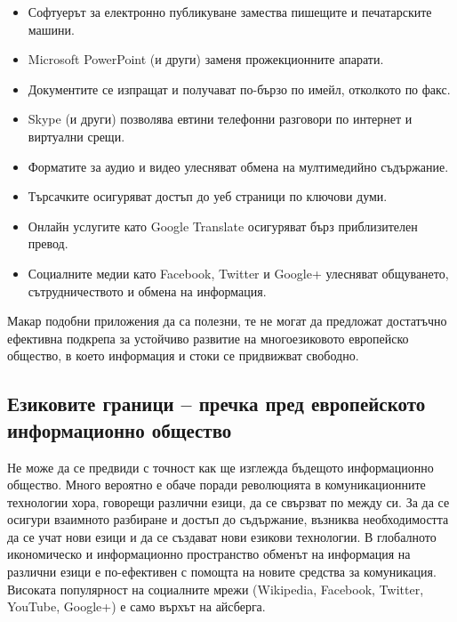 \begin{multicols}{2}
  \begin{itemize}
  \item Софтуерът за електронно публикуване замества пишещите и печатарските машини.
  \item Microsoft PowerPoint (и други) заменя прожекционните апарати.
  \item Документите се изпращат и получават по-бързо по имейл, отколкото по факс.
  \item Skype (и други) позволява евтини телефонни разговори по интернет и виртуални срещи.
  \item Форматите за аудио и видео улесняват обмена на мултимедийно съдържание.
  \item Търсачките осигуряват достъп до уеб страници по ключови думи.
  \item Онлайн услугите като Google Translate осигуряват бърз приблизителен превод.
  \item Социалните медии като Facebook,  Twitter  и  Google+  улесняват общуването, сътрудничеството и обмена на информация.
  \end{itemize}

  Макар подобни приложения да са полезни, те не могат да предложат достатъчно ефективна подкрепа за устойчиво развитие на многоезиковото европейско общество, в което информация и стоки се придвижват свободно.

  \subsection{Езиковите граници -- пречка пред европейското информационно общество}

  Не може да се предвиди с точност как ще изглежда
  бъдещото информационно общество. Много вероятно е обаче поради революцията в комуникационните технологии хора, говорещи различни езици, да се свързват по между си.
  За да се осигури взаимното разбиране и достъп до съдържание, възниква необходимостта да се учат нови езици и да се създават нови езикови технологии. В глобалното икономическо и информационно пространство обменът на информация на различни езици е по-ефективен с помощта на новите средства за комуникация. Високата популярност на социалните мрежи (Wikipedia, Facebook, Twitter, YouTube, Google+) е само върхът на айсберга.



\end{multicols}
